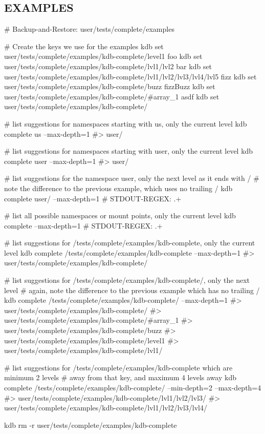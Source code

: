 \subsection*{E\+X\+A\+M\+P\+L\+ES}


\begin{DoxyCode}
# Backup-and-Restore: user/tests/complete/examples

# Create the keys we use for the examples
kdb set user/tests/complete/examples/kdb-complete/level1 foo
kdb set user/tests/complete/examples/kdb-complete/lvl1/lvl2 bar
kdb set user/tests/complete/examples/kdb-complete/lvl1/lvl2/lvl3/lvl4/lvl5 fizz
kdb set user/tests/complete/examples/kdb-complete/buzz fizzBuzz
kdb set user/tests/complete/examples/kdb-complete/#array\_1 asdf
kdb set user/tests/complete/examples/kdb-complete/%

# list suggestions for namespaces starting with us, only the current level
kdb complete us --max-depth=1
#> user/

# list suggestions for namespaces starting with user, only the current level
kdb complete user --max-depth=1
#> user/

# list suggestions for the namespace user, only the next level as it ends with /
# note the difference to the previous example, which uses no trailing /
kdb complete user/ --max-depth=1
# STDOUT-REGEX: .+

# list all possible namespaces or mount points, only the current level
kdb complete --max-depth=1
# STDOUT-REGEX: .+

# list suggestions for /tests/complete/examples/kdb-complete, only the current level
kdb complete /tests/complete/examples/kdb-complete --max-depth=1
#> user/tests/complete/examples/kdb-complete/

# list suggestions for /tests/complete/examples/kdb-complete/, only the next level
# again, note the difference to the previous example which has no trailing /
kdb complete /tests/complete/examples/kdb-complete/ --max-depth=1
#> user/tests/complete/examples/kdb-complete/%
#> user/tests/complete/examples/kdb-complete/#array\_1
#> user/tests/complete/examples/kdb-complete/buzz
#> user/tests/complete/examples/kdb-complete/level1
#> user/tests/complete/examples/kdb-complete/lvl1/

# list suggestions for /tests/complete/examples/kdb-complete which are minimum 2 levels
# away from that key, and maximum 4 levels away
kdb complete /tests/complete/examples/kdb-complete/ --min-depth=2 --max-depth=4
#> user/tests/complete/examples/kdb-complete/lvl1/lvl2/lvl3/
#> user/tests/complete/examples/kdb-complete/lvl1/lvl2/lvl3/lvl4/

kdb rm -r user/tests/complete/examples/kdb-complete
\end{DoxyCode}


